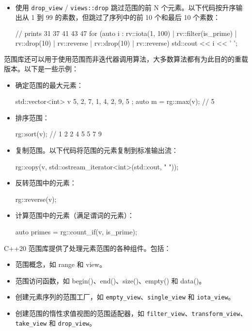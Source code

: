 \begin{itemize}
\item
使用 \verb|drop_view| / \verb|views::drop| 跳过范围的前 N 个元素。以下代码按升序输出从 1 到 99 的素数，但跳过了序列中的前 10 个和最后 10 个素数：

\begin{cpp}
// prints 31 37 41 43 47
for (auto i : rv::iota(1, 100) |
              rv::filter(is_prime) |
              rv::drop(10) |
              rv::reverse |
              rv::drop(10) |
              rv::reverse)
    std::cout << i << ' ';
\end{cpp}
\end{itemize}

范围库还可以用于使用范围而非迭代器调用算法，大多数算法都有为此目的的重载版本。以下是一些示例：

\begin{itemize}
\item
确定范围的最大元素：

\begin{cpp}
std::vector<int> v{ 5, 2, 7, 1, 4, 2, 9, 5 };
auto m = rg::max(v); // 5
\end{cpp}

\item
排序范围：

\begin{cpp}
rg::sort(v); // 1 2 2 4 5 5 7 9
\end{cpp}

\item
复制范围。以下代码将范围的元素复制到标准输出流：

\begin{cpp}
rg::copy(v, std::ostream_iterator<int>(std::cout, " "));
\end{cpp}

\item
反转范围中的元素：

\begin{cpp}
rg::reverse(v);
\end{cpp}

\item
计算范围中的元素（满足谓词的元素）：

\begin{cpp}
auto primes = rg::count_if(v, is_prime);
\end{cpp}
\end{itemize}


C++20 范围库提供了处理元素范围的各种组件。包括：

\begin{itemize}
\item
范围概念，如 range 和 view。

\item
范围访问函数，如 begin()、end()、size()、empty() 和 data()。

\item
创建元素序列的范围工厂，如 \verb|empty_view|、\verb|single_view| 和 \verb|iota_view|。

\item
创建范围的惰性求值视图的范围适配器，如 \verb|filter_view|、\verb|transform_view|、\verb|take_view| 和 \verb|drop_view|。
\end{itemize}

